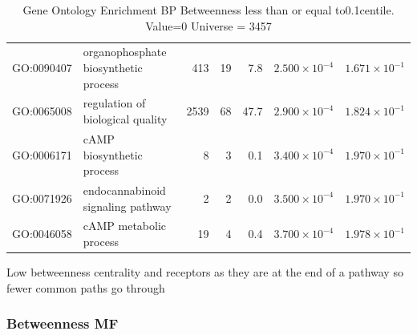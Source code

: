 \begin{table}[ht]
\begin{tabular}{llrrrrr}
  GO:0090407 & organophosphate biosynthetic process & 413 & 19 & 7.8 & $2.500 \times 10^{-4}$ & $1.671 \times 10^{-1}$ \\ 
  GO:0065008 & regulation of biological quality & 2539 & 68 & 47.7 & $2.900 \times 10^{-4}$ & $1.824 \times 10^{-1}$ \\ 
  GO:0006171 & cAMP biosynthetic process & 8 & 3 & 0.1 & $3.400 \times 10^{-4}$ & $1.970 \times 10^{-1}$ \\ 
  GO:0071926 & endocannabinoid signaling pathway & 2 & 2 & 0.0 & $3.500 \times 10^{-4}$ & $1.970 \times 10^{-1}$ \\ 
  GO:0046058 & cAMP metabolic process & 19 & 4 & 0.4 & $3.700 \times 10^{-4}$ & $1.978 \times 10^{-1}$ \\ 
   \hline
\end{tabular}
\caption{Gene Ontology Enrichment BP Betweenness  less than or equal to0.1centile.   Value=0 Universe = 3457} 
\label{tab:Gene Ontology Enrichment BP Betweenness  less than or equal to0.1centile.   Value=0 Universe = 3457}
\end{table}

Low betweenness centrality and receptors as they are at the end of a pathway so fewer common paths go through

\subsubsection{Betweenness MF}

